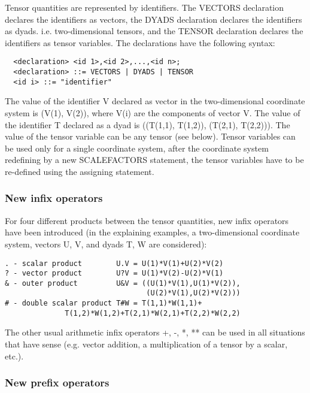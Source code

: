      Tensor  quantities  are  represented  by  identifiers.  The VECTORS
declaration declares  the identifiers  as vectors, the DYADS declaration
declares the identifiers as dyads. i.e. two-dimensional tensors, and the
TENSOR  declaration  declares  the  identifiers as tensor variables. The
declarations have the following syntax:
\begin{verbatim}
  <declaration> <id 1>,<id 2>,...,<id n>;
  <declaration> ::= VECTORS | DYADS | TENSOR
  <id i> ::= "identifier"
\end{verbatim}
The value of the identifier V declared as vector in  the two-dimensional
coordinate  system  is  (V(1),  V(2)),  where V(i) are the components of
vector V. The value of the identifier T declared as a dyad  is ((T(1,1),
T(1,2)), (T(2,1),  T(2,2))). The value of the tensor variable can be any
tensor (see below). Tensor variables  can  be  used  only  for  a single
coordinate  system,  after  the  coordinate  system  redefining by a new
SCALEFACTORS statement, the tensor variables have to be re-defined using
the assigning statement.


\subsubsection{New infix operators}


     For  four  different  products  between  the tensor quantities, new
infix operators have been  introduced  (in  the  explaining  examples, a
two-dimensional  coordinate  system,  vectors  U,  V, and dyads T, W are
considered):
\begin{verbatim}
. - scalar product        U.V = U(1)*V(1)+U(2)*V(2)
? - vector product        U?V = U(1)*V(2)-U(2)*V(1)
& - outer product         U&V = ((U(1)*V(1),U(1)*V(2)),
                                 (U(2)*V(1),U(2)*V(2)))
# - double scalar product T#W = T(1,1)*W(1,1)+
              T(1,2)*W(1,2)+T(2,1)*W(2,1)+T(2,2)*W(2,2)
\end{verbatim}
The other usual arithmetic infix operators +, -,  *, **  can be  used in
all situations  that have  sense (e.g. vector addition, a multiplication
of a tensor by a scalar, etc.).


\subsubsection{New prefix operators}

